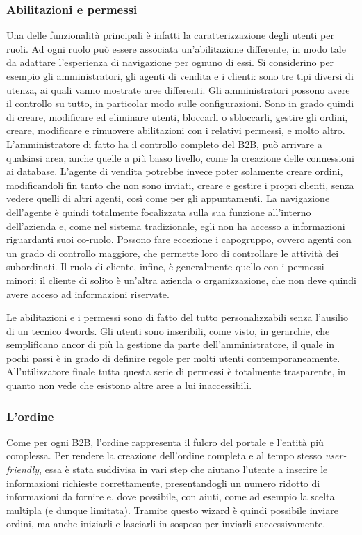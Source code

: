 \subsubsection{Abilitazioni e permessi}
Una delle funzionalità principali è infatti la caratterizzazione degli utenti per ruoli. Ad ogni ruolo può essere associata un'abilitazione differente, in modo tale da adattare l'esperienza di navigazione per ognuno di essi. Si considerino per esempio gli amministratori, gli agenti di vendita e i clienti: sono tre tipi diversi di utenza, ai quali vanno mostrate aree differenti. Gli amministratori possono avere il controllo su tutto, in particolar modo sulle configurazioni. Sono in grado quindi di creare, modificare ed eliminare utenti, bloccarli o sbloccarli, gestire gli ordini, creare, modificare e rimuovere abilitazioni con i relativi permessi, e molto altro. L'amministratore di fatto ha il controllo completo del B2B, può arrivare a qualsiasi area, anche quelle a più basso livello, come la creazione delle connessioni ai database. L'agente di vendita potrebbe invece poter solamente creare ordini, modificandoli fin tanto che non sono inviati, creare e gestire i propri clienti, senza vedere quelli di altri agenti, così come per gli appuntamenti. La navigazione dell'agente è quindi totalmente focalizzata sulla sua funzione all'interno dell'azienda e, come nel sistema tradizionale, egli non ha accesso a informazioni riguardanti suoi co-ruolo. Possono fare eccezione i capogruppo, ovvero agenti con un grado di controllo maggiore, che permette loro di controllare le attività dei subordinati. Il ruolo di cliente, infine, è generalmente quello con i permessi minori: il cliente di solito è un'altra azienda o organizzazione, che non deve quindi avere acceso ad informazioni riservate.

Le abilitazioni e i permessi sono di fatto del tutto personalizzabili senza l'ausilio di un tecnico 4words. Gli utenti sono inseribili, come visto, in gerarchie, che semplificano ancor di più la gestione da parte dell'amministratore, il quale in pochi passi è in grado di definire regole per molti utenti contemporaneamente. All'utilizzatore finale tutta questa serie di permessi è totalmente trasparente, in quanto non vede che esistono altre aree a lui inaccessibili.

\subsubsection{L'ordine}
Come per ogni B2B, l'ordine rappresenta il fulcro del portale e l'entità più complessa. Per rendere la creazione dell'ordine completa e al tempo stesso \textit{user-friendly}, essa è stata suddivisa in vari step che aiutano l'utente a inserire le informazioni richieste correttamente, presentandogli un numero ridotto di informazioni da fornire e, dove possibile, con aiuti, come ad esempio la scelta multipla (e dunque limitata). Tramite questo \gls{wizard} è quindi possibile inviare ordini, ma anche iniziarli e lasciarli in sospeso per inviarli successivamente.

